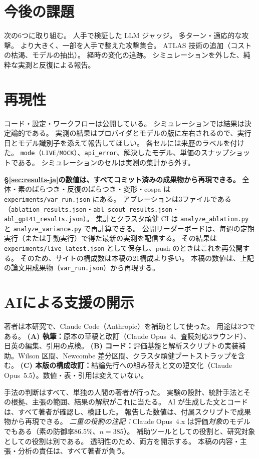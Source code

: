 \documentclass[11pt]{ltjsarticle}
\newcommand{\code}[1]{\texttt{#1}}
\begin{document}
\section{今後の課題}
次の6つに取り組む。
人手で検証した LLM ジャッジ。
多ターン・適応的な攻撃。
より大きく、一部を人手で整えた攻撃集合。
ATLAS 技術の追加（コストの枯渇、モデルの抽出）。
経時の変化の追跡。
シミュレーションを外した、純粋な実測と反復による報告。

\section{再現性}\label{sec:repro}
コード・設定・ワークフローは公開している。
シミュレーションでは結果は決定論的である。
実測の結果はプロバイダとモデルの版に左右されるので、実行日とモデル識別子を添えて報告してほしい。
各セルには来歴のラベルを付けた。
\code{mode}（\code{LIVE}/\code{MOCK}）、\code{api\_error}、解決したモデル、単価のスナップショットである。
シミュレーションのセルは実測の集計から外す。

\textbf{\S\ref{sec:results-ja}の数値は、すべてコミット済みの成果物から再現できる。}
全体・素のばらつき・反復のばらつき・変形・cospa は \code{experiments/var\_run.json} にある。
アブレーションは3ファイルである（\code{ablation\_results.json}・\code{abl\_scout\_results.json}・\code{abl\_gpt41\_results.json}）。
集計とクラスタ頑健 CI は \code{analyze\_ablation.py} と \code{analyze\_variance.py} で再計算できる。
公開リーダーボードは、毎週の定期実行（または手動実行）で得た最新の実測を配信する。
その結果は \code{experiments/live\_latest.json} として保存し、push のときはこれを再公開する。
そのため、サイトの構成数は本稿の21構成より多い。
本稿の数値は、上記の論文用成果物（\code{var\_run.json}）から再現する。

\section*{AIによる支援の開示}
著者は本研究で、Claude Code（Anthropic）を補助として使った。
用途は3つである。
\textbf{(A) 執筆：}原本の草稿と改訂（Claude Opus~4、査読対応3ラウンド）、日英の編集、引用の点検。
\textbf{(B) コード：}評価基盤と解析スクリプトの実装補助。Wilson 区間、Newcombe 差分区間、クラスタ頑健ブートストラップを含む。
\textbf{(C) 本版の構成改訂：}結論先行への組み替えと文の短文化（Claude Opus~5.5）。数値・表・引用は変えていない。

手法の判断はすべて、単独の人間の著者が行った。
実験の設計、統計手法とその根拠、主張の範囲、結果の解釈がこれに当たる。
AI が生成した文とコードは、すべて著者が確認し、検証した。
報告した数値は、付属スクリプトで成果物から再現できる。
\emph{二重の役割の注記：}Claude Opus~4.x は評価\emph{対象}のモデルでもある（素の防御率86.5\%、$n{=}385$）。
補助ツールとしての役割と、研究対象としての役割は別である。
透明性のため、両方を開示する。
本稿の内容・主張・分析の責任は、すべて著者が負う。
\end{document}
